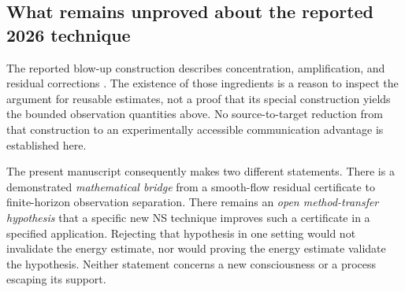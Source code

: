 \subsection{What remains unproved about the reported 2026 technique}
The reported blow-up construction describes concentration, amplification, and residual corrections \citep{openains}. The existence of those ingredients is a reason to inspect the argument for reusable estimates, not a proof that its special construction yields the bounded observation quantities above. No source-to-target reduction from that construction to an experimentally accessible communication advantage is established here.

The present manuscript consequently makes two different statements. There is a demonstrated \emph{mathematical bridge} from a smooth-flow residual certificate to finite-horizon observation separation. There remains an \emph{open method-transfer hypothesis} that a specific new NS technique improves such a certificate in a specified application. Rejecting that hypothesis in one setting would not invalidate the energy estimate, nor would proving the energy estimate validate the hypothesis. Neither statement concerns a new consciousness or a process escaping its support.
